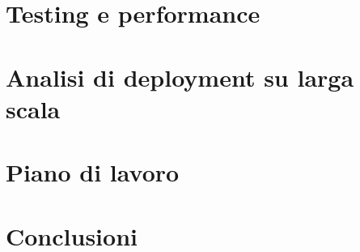 \documentclass[12pt]{article}
\begin{document}
\newpage



\section{Testing e performance}



\newpage



\section{Analisi di deployment su larga scala}



\newpage



\section{Piano di lavoro}



\newpage



\section{Conclusioni}



\newpage



\appendix
{}
\end{document}
